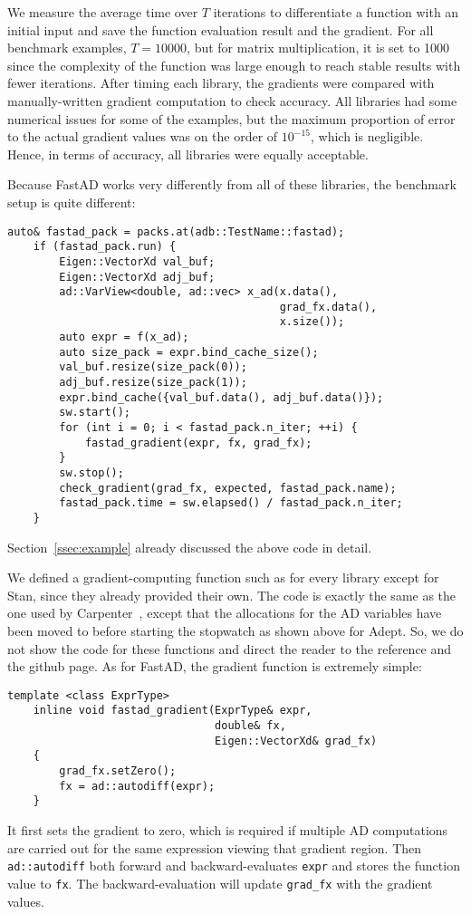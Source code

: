 We measure the average time over $T$ iterations
to differentiate a function
with an initial input and 
save the function evaluation result and the gradient.
For all benchmark examples, $T = 10000$,
but for matrix multiplication, it is set to 1000 
since the complexity of the function was large enough to reach stable results with fewer iterations.
After timing each library, the gradients were compared with manually-written gradient computation to check accuracy.
All libraries had some numerical issues for some of the examples,
but the maximum proportion of error to the actual gradient values was on the order of $ 10^{-15}$, which is negligible.
Hence, in terms of accuracy, all libraries were equally acceptable.

Because FastAD works very differently from all of these libraries,
the benchmark setup is quite different:
\begin{lstlisting}[style=customcpp]
    auto& fastad_pack = packs.at(adb::TestName::fastad);
    if (fastad_pack.run) {
        Eigen::VectorXd val_buf;
        Eigen::VectorXd adj_buf;
        ad::VarView<double, ad::vec> x_ad(x.data(),
                                          grad_fx.data(),
                                          x.size());
        auto expr = f(x_ad);
        auto size_pack = expr.bind_cache_size();
        val_buf.resize(size_pack(0));
        adj_buf.resize(size_pack(1));
        expr.bind_cache({val_buf.data(), adj_buf.data()});
        sw.start();
        for (int i = 0; i < fastad_pack.n_iter; ++i) {
            fastad_gradient(expr, fx, grad_fx);
        }
        sw.stop();
        check_gradient(grad_fx, expected, fastad_pack.name);
        fastad_pack.time = sw.elapsed() / fastad_pack.n_iter;
    }
\end{lstlisting}
Section~\ref{ssec:example} already discussed the above code in detail.
\fi

We defined a gradient-computing function 
such as  
for every library except for Stan,
since they already provided their own.
The code is exactly the same as the one used by Carpenter~\cite{carpenter:2015},
except that the allocations for the AD variables have been moved to before starting the stopwatch as shown above for Adept.
So, we do not show the code for these functions and 
direct the reader to the reference and the github page.
As for FastAD, the gradient function is extremely simple:
\begin{lstlisting}[style=customcpp]
    template <class ExprType>
    inline void fastad_gradient(ExprType& expr,
                                double& fx,
                                Eigen::VectorXd& grad_fx) 
    {
        grad_fx.setZero();
        fx = ad::autodiff(expr);
    }
\end{lstlisting}
It first sets the gradient to zero, which is required if multiple AD computations 
are carried out for the same expression viewing that gradient region.
Then \verb|ad::autodiff| both forward and backward-evaluates \verb|expr|
and stores the function value to \verb|fx|.
The backward-evaluation will update \verb|grad_fx| with the gradient values.
\fi

